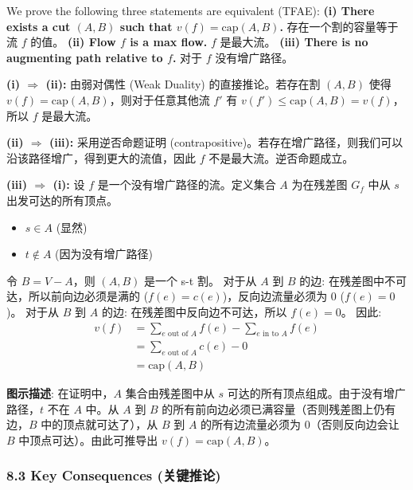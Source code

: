 \documentclass[10pt,a4paper,openany]{ctexbook}
\theoremstyle{definition}
\theoremstyle{remark}
\renewenvironment{quote}
  {\list{}{\leftmargin=1em\rightmargin=0pt\topsep=0.5pt\partopsep=0pt}\item[]}
  {\endlist}
\begin{document}
We prove the following three statements are equivalent (TFAE):
\textbf{(i) There exists a cut $(A, B)$ such that $v(f) = \text{cap}(A, B)$.}
存在一个割的容量等于流 $f$ 的值。
\textbf{(ii) Flow $f$ is a max flow.}
$f$ 是最大流。
\textbf{(iii) There is no augmenting path relative to $f$.}
对于 $f$ 没有增广路径。
\vspace{-2pt}

\textbf{(i) $\Rightarrow$ (ii):}
由弱对偶性 (Weak Duality) 的直接推论。若存在割 $(A,B)$ 使得 $v(f) = \text{cap}(A,B)$，则对于任意其他流 $f'$ 有 $v(f') \le \text{cap}(A,B) = v(f)$，所以 $f$ 是最大流。
\vspace{-2pt}

\textbf{(ii) $\Rightarrow$ (iii):}
采用逆否命题证明 (contrapositive)。若存在增广路径，则我们可以沿该路径增广，得到更大的流值，因此 $f$ 不是最大流。逆否命题成立。
\vspace{-2pt}

\textbf{(iii) $\Rightarrow$ (i):}
设 $f$ 是一个没有增广路径的流。定义集合 $A$ 为在残差图 $G_f$ 中从 $s$ 出发可达的所有顶点。
\begin{itemize}
\item $s \in A$ (显然)
\item $t \notin A$ (因为没有增广路径)

\end{itemize}

令 $B = V - A$，则 $(A, B)$ 是一个 s-t 割。
对于从 $A$ 到 $B$ 的边: 在残差图中不可达，所以前向边必须是满的 ($f(e) = c(e)$)，反向边流量必须为 0 ($f(e) = 0$)。
对于从 $B$ 到 $A$ 的边: 在残差图中反向边不可达，所以 $f(e) = 0$。
因此:
\[
\begin{aligned}
v(f) &= \sum_{e \text{ out of } A} f(e) - \sum_{e \text{ in to } A} f(e) \\
&= \sum_{e \text{ out of } A} c(e) - 0 \\
&= \text{cap}(A, B)
\end{aligned}
\]

\begin{quote}
\textbf{图示描述}: 在证明中，$A$ 集合由残差图中从 $s$ 可达的所有顶点组成。由于没有增广路径，$t$ 不在 $A$ 中。从 $A$ 到 $B$ 的所有前向边必须已满容量（否则残差图上仍有边，$B$ 中的顶点就可达了），从 $B$ 到 $A$ 的所有边流量必须为 0（否则反向边会让 $B$ 中顶点可达）。由此可推导出 $v(f) = \text{cap}(A, B)$。

\end{quote}

\subsubsection{8.3 Key Consequences (关键推论)}
\end{document}
